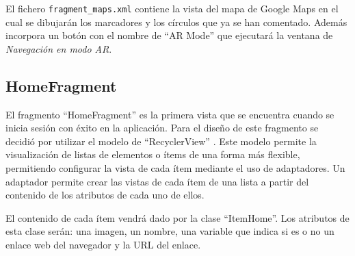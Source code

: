 \bigskip



El fichero \texttt{fragment\_maps.xml} contiene la vista del mapa de Google Maps en el cual se dibujarán los marcadores y los círculos que ya se han comentado. Además incorpora un botón con el nombre de ``AR Mode'' que ejecutará la ventana de \textit{Navegación en modo AR}.

% 
    

\subsection{HomeFragment}

El fragmento ``HomeFragment'' es la primera vista que se encuentra cuando se inicia sesión con éxito en la aplicación. Para el diseño de este fragmento se decidió por utilizar el modelo de ``RecyclerView'' \cite{URL::recycler}. Este modelo permite la visualización de listas de elementos o ítems de una forma más flexible, permitiendo configurar la vista de cada ítem mediante el uso de adaptadores. Un adaptador permite crear las vistas de cada ítem de una lista a partir del contenido de los atributos de cada uno de ellos.

El contenido de cada ítem vendrá dado por la clase ``ItemHome''. Los atributos de esta clase serán: una imagen, un nombre, una variable que indica si es o no un enlace web del navegador y la URL del enlace.


